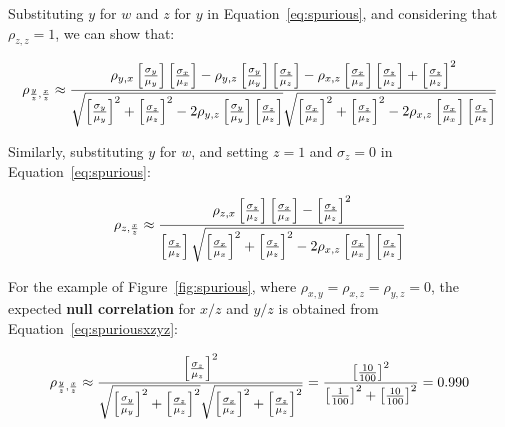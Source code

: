 \begin{enumerate}
Substituting $y$ for $w$ and $z$ for $y$ in
Equation~\ref{eq:spurious}, and considering that $\rho_{z,z}=1$, we
can show that:

\begin{equation}
  \noindent \rho_{\frac{y}{z},\frac{x}{z}} \approx
  \frac{\rho_{y,x}\left[\frac{\sigma_y}{\mu_y}\right]
    \left[\frac{\sigma_x}{\mu_x}\right] -
    \rho_{y,z}\left[\frac{\sigma_y}{\mu_y}\right]
    \left[\frac{\sigma_z}{\mu_z}\right] -
    \rho_{x,z}\left[\frac{\sigma_x}{\mu_x}\right]
    \left[\frac{\sigma_z}{\mu_z}\right] +
    \left[\frac{\sigma_z}{\mu_z}\right]^2
  }{
    \sqrt{\left[\frac{\sigma_y}{\mu_y}\right]^2 +
      \left[\frac{\sigma_z}{\mu_z}\right]^2 -
      2 \rho_{y,z}\left[\frac{\sigma_y}{\mu_y}\right]
      \left[\frac{\sigma_z}{\mu_z}\right]}
    \sqrt{\left[\frac{\sigma_x}{\mu_x}\right]^2 +
      \left[\frac{\sigma_z}{\mu_z}\right]^2 -
      2 \rho_{x,z}\left[\frac{\sigma_x}{\mu_x}\right]
      \left[\frac{\sigma_z}{\mu_z}\right]
    }
  }
  \label{eq:spuriousxzyz}
\end{equation}

Similarly, substituting $y$ for $w$, and setting $z=1$ and
$\sigma_z=0$ in Equation~\ref{eq:spurious}:

\begin{equation}
  \noindent \rho_{z,\frac{x}{z}} \approx
  \frac{\rho_{z,x}\left[\frac{\sigma_z}{\mu_z}\right]
    \left[\frac{\sigma_x}{\mu_x}\right] -
    \left[\frac{\sigma_z}{\mu_z}\right]^2
  }{
    \left[\frac{\sigma_z}{\mu_z}\right]
    \sqrt{\left[\frac{\sigma_x}{\mu_x}\right]^2 +
      \left[\frac{\sigma_z}{\mu_z}\right]^2 -
      2 \rho_{x,z}\left[\frac{\sigma_x}{\mu_x}\right]
      \left[\frac{\sigma_z}{\mu_z}\right]
    }
  }
  \label{eq:spuriouszxz}
\end{equation}

For the example of Figure~\ref{fig:spurious}, where
$\rho_{x,y}=\rho_{x,z}=\rho_{y,z}=0$, the expected \textbf{null
  correlation} for $x/z$ and $y/z$ is obtained from
Equation~\ref{eq:spuriousxzyz}:

\begin{equation}
  \noindent \rho_{\frac{y}{z},\frac{x}{z}} \approx
  \frac{
    \left[\frac{\sigma_z}{\mu_z}\right]^2
  }{
    \sqrt{\left[\frac{\sigma_y}{\mu_y}\right]^2 +
      \left[\frac{\sigma_z}{\mu_z}\right]^2}
    \sqrt{\left[\frac{\sigma_x}{\mu_x}\right]^2 +
      \left[\frac{\sigma_z}{\mu_z}\right]^2}
  }
  =
  \frac{
    \left[\frac{10}{100}\right]^2
  }{
    \left[\frac{1}{100}\right]^2 +
      \left[\frac{10}{100}\right]^2
  }
  = 0.990
  \label{eq:spuriousxzyzindepxyz}
\end{equation}


\end{enumerate}
